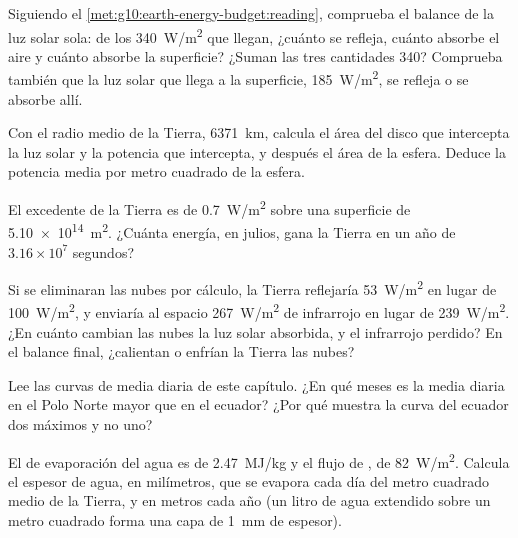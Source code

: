 \begin{exercise}[$\star\star$]\label{exo:g10:earth-energy-budget:7}
Siguiendo el \cref{met:g10:earth-energy-budget:reading}, comprueba el
balance de la luz solar sola: de los \qty{340}{W/m^2} que llegan, ¿cuánto se
refleja, cuánto absorbe el aire y cuánto absorbe la superficie? ¿Suman las
tres cantidades 340? Comprueba también que la luz solar que llega a la
superficie, \qty{185}{W/m^2}, se refleja o se absorbe allí.
\end{exercise}

\begin{exercise}[$\star\star$]\label{exo:g10:earth-energy-budget:8}
Con el radio medio de la Tierra, \qty{6371}{km}, calcula el área del disco
que intercepta la luz solar y la potencia que intercepta, y después el área
de la esfera. Deduce la potencia media por metro cuadrado de la esfera.
\end{exercise}

\begin{exercise}[$\star\star$]\label{exo:g10:earth-energy-budget:9}
El excedente de la Tierra es de \qty{0.7}{W/m^2} sobre una superficie de
\qty{5.10e14}{m^2}. ¿Cuánta energía, en julios, gana la Tierra en un año de
$3.16\times10^7$ segundos?
\end{exercise}

\begin{exercise}[$\star\star$]\label{exo:g10:earth-energy-budget:10}
Si se eliminaran las nubes por cálculo, la Tierra reflejaría
\qty{53}{W/m^2} en lugar de \qty{100}{W/m^2}, y enviaría al espacio
\qty{267}{W/m^2} de infrarrojo en lugar de \qty{239}{W/m^2}. ¿En cuánto
cambian las nubes la luz solar absorbida, y el infrarrojo perdido? En el
balance final, ¿calientan o enfrían la Tierra las nubes?
\end{exercise}

\begin{exercise}[$\star\star$]\label{exo:g10:earth-energy-budget:11}
Lee las curvas de  media diaria de este capítulo. ¿En qué meses es
la  media diaria en el Polo Norte mayor que en el ecuador? ¿Por qué
muestra la curva del ecuador dos máximos y no uno?
\end{exercise}

\begin{exercise}[$\star\star\star$]\label{exo:g10:earth-energy-budget:12}
El  de evaporación del agua es de \qty{2.47}{MJ/kg} y el flujo
de , de \qty{82}{W/m^2}. Calcula el espesor de agua, en
milímetros, que se evapora cada día del metro cuadrado medio de la Tierra, y
en metros cada año (un litro de agua extendido sobre un metro cuadrado forma
una capa de \qty{1}{mm} de espesor).
\end{exercise}

